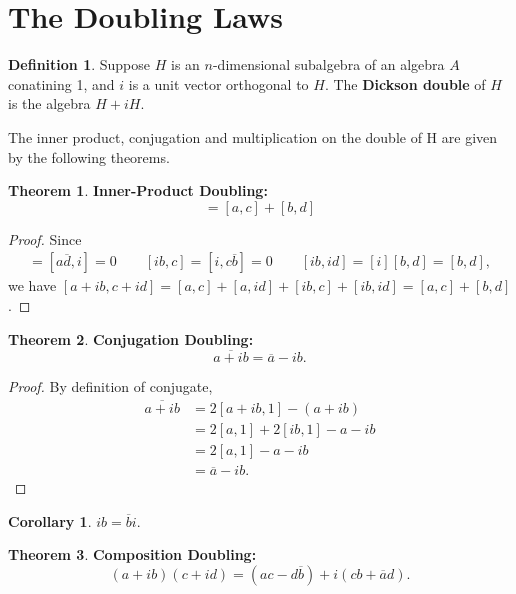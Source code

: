 \documentclass[11pt]{report}
\theoremstyle{plain}
\theoremstyle{definition}
\newtheorem{defn}{Definition}
\newtheorem{theorem}{Theorem}
\newtheorem{coro}{Corollary}
\begin{document}
  \section{The Doubling Laws}
  \begin{defn}
  Suppose $ H $ is an $ n $-dimensional subalgebra of an algebra $ A $ conatining 1, and $ i $ is a unit vector orthogonal to $ H $. The \textbf{Dickson double} of $ H $ is the algebra $ H+iH $. 
   \end{defn}
   The inner product, conjugation and multiplication on the double of H are given by the following theorems. 
   
  \begin{theorem}
  	\textbf{ Inner-Product Doubling: }
  	\begin{equation*}
  	[a+ib,c+id] = [a,c] + [b,d] \tag{D1}\label{D1}
  	\end{equation*}
  \end{theorem}
  \begin{proof}
  	Since 
  	\begin{align*}
[a,id] = [a\overline{d},i] = 0 \qquad [ib,c] = [i,c\overline{b}] = 0 \qquad [ib,id] = [i][b,d] = [b,d],
  	\end{align*}
  we have $ [a+ib,c+id] = [a,c] + [a,id] + [ib,c] +[ib,id] = [a,c]+[b,d] $.
  \end{proof} 
  \begin{theorem}
  	\textbf{ Conjugation Doubling: }
  	\begin{equation*}
  	\overline{a+ib} = \overline{a} - ib. \tag{D2}\label{D2}
  	\end{equation*}
  \end{theorem}
  \begin{proof}
By definition of conjugate,
\begin{align*}
\overline{a+ib} &= 2[a+ib,1] - (a+ib)\\
&=2[a,1]+2[ib,1] - a - ib\\
&=2[a,1]-a-ib\\
&=\overline{a} - ib.
\end{align*}
  
\end{proof}
\begin{coro}
$ ib = \overline{b}i$.
\end{coro}
\begin{theorem}
	\textbf{ Composition Doubling: }
	\begin{equation*}
	(a+ib)(c+id) = (ac-d\overline{b}) + i(cb + \overline{a}d). \tag{D3}\label{D3}
	\end{equation*}
\end{theorem}
\end{document}

